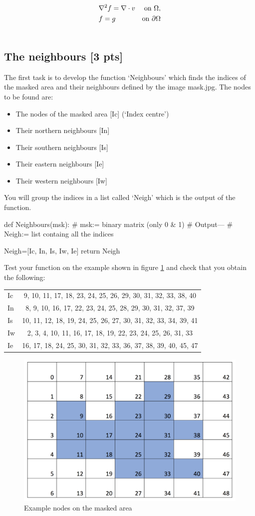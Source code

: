 \documentclass[paper=a4, fontsize=12pt]{scrartcl} %
\numberwithin{equation}{section}       %
\numberwithin{figure}{section}         %
\numberwithin{table}{section}          %
\begin{document}
\begin{align}
&\nabla^2 f= \nabla \cdot v  & \text{on } \Omega, \\ \notag
& f=g &  \text{on } \partial \Omega \\ \notag
\end{align}

\subsection{The neighbours [3 pts]}
The first task is to develop the function `Neighbours' which finds the indices of the masked area and their neighbours defined by the image mask.jpg. The nodes to be found are:

\begin{itemize}
\item The nodes of the masked area [Ic] (`Index centre')
\item Their northern neighbours [In]
\item Their southern neighbours [Is]
\item Their eastern neighbours [Ie]
\item Their western neighbours [Iw]
\end{itemize}

You will group the indices in a list called `Neigh' which is the output of the function. 
\begin{python}
def Neighbours(msk):
# msk:= binary matrix (only 0 & 1)
# Output---
# Neigh:=  list containg all the indices 
   
    Neigh=[Ic, In, Is, Iw, Ie]
    return Neigh
\end{python}
Test your function on the example shown in figure \ref{fig:table} and check that you obtain the following: \\

\begin{tabular}{ l | c }
  \hline
Ic& 9, 10, 11, 17, 18, 23, 24, 25, 26, 29, 30, 31, 32, 33, 38, 40\\
In&8,  9, 10, 16, 17, 22, 23, 24, 25, 28, 29, 30, 31, 32, 37, 39 \\
Is&10, 11, 12, 18, 19, 24, 25, 26, 27, 30, 31, 32, 33, 34, 39, 41\\
Iw&2,  3,  4, 10, 11, 16, 17, 18, 19, 22, 23, 24, 25, 26, 31, 33\\
Ie&16, 17, 18, 24, 25, 30, 31, 32, 33, 36, 37, 38, 39, 40, 45, 47\\
\hline  
\end{tabular}
\begin{figure}[H]
    \centering
        \includegraphics[width=.5\textwidth]{Table}
    \caption{Example nodes on the masked area}
    \label{fig:table}
\end{figure}
\end{document}
